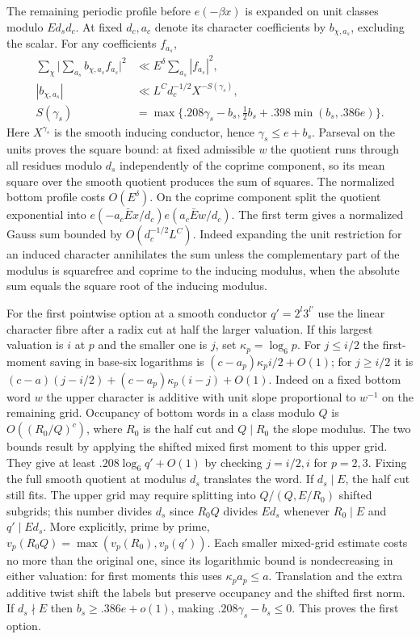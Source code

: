 \documentclass[11pt,a4paper]{article}
\theoremstyle{paperplain}
\numberwithin{equation}{section}
\begin{document}
The remaining periodic profile before $e(-\beta x)$ is expanded
on unit classes modulo $Ed_sd_c$. At fixed $d_c,a_c$ denote its
character coefficients by $b_{\chi,a_s}$, excluding the scalar.
For any coefficients $f_{a_s}$,
\begin{align}
 \sum_\chi\Big|\sum_{a_s}b_{\chi,a_s}f_{a_s}\Big|^2
    &\ll E^\delta\sum_{a_s}|f_{a_s}|^2, \label{six:sixmask-charsquare}\\
 |b_{\chi,a_s}|&\ll L^C d_c^{-1/2}
             X^{-S(\gamma_s)},\nonumber\\
 S(\gamma_s)&=\max\{
 .208\gamma_s-b_s,\tfrac12 b_s+.398\min(b_s,.386e)\}.
 \label{six:sixmask-charpoint}
\end{align}
Here $X^{\gamma_s}$ is the smooth inducing conductor, hence
$\gamma_s\le e+b_s$. Parseval on the units proves the square
bound: at fixed admissible $w$ the quotient runs through all
residues modulo $d_s$ independently of the coprime component, so
its mean square over the smooth quotient produces the sum of
squares. The normalized bottom profile costs $O(E^\delta)$.
On the coprime component split the quotient exponential into
$e(-a_c\bar E x/d_c)e(a_c\bar E w/d_c)$. The first term gives
a normalized Gauss sum bounded by $O(d_c^{-1/2}L^C)$.
Indeed expanding the unit restriction for an induced character
annihilates the sum unless the complementary part of the modulus
is squarefree and coprime to the inducing modulus, when the
absolute sum equals the square root of the inducing modulus.

For the first pointwise option at a smooth conductor $q'=2^l3^{l'}$
use the linear character fibre after a radix cut at half the larger
valuation. If this largest valuation is $i$ at $p$ and the smaller
one is $j$, set $\kappa_p=\log_6p$. For $j\le i/2$ the first-moment
saving in base-six logarithms is
$(c-a_p)\kappa_p i/2+O(1)$; for $j\ge i/2$ it is
$(c-a)(j-i/2)+(c-a_p)\kappa_p(i-j)+O(1)$.
Indeed on a fixed bottom word $w$ the upper character is additive
with unit slope proportional to $w^{-1}$ on the remaining grid.
Occupancy of bottom words in a class modulo $Q$ is
$O((R_0/Q)^c)$, where $R_0$ is the half cut and $Q\mid R_0$
the slope modulus. The two bounds result by applying the shifted
mixed first moment to this upper grid. They give at least
$.208\log_6 q'+O(1)$ by checking $j=i/2,i$ for $p=2,3$.
Fixing the full smooth quotient at modulus $d_s$ translates the
word. If $d_s\mid E$, the half cut still fits. The upper grid may
require splitting into $Q/(Q,E/R_0)$ shifted subgrids;
this number divides $d_s$ since $R_0Q$ divides $E d_s$ whenever
$R_0\mid E$ and $q'\mid Ed_s$. More explicitly, prime by prime,
$v_p(R_0Q)=\max(v_p(R_0),v_p(q'))$. Each smaller mixed-grid
estimate costs no more than the original one, since its logarithmic
bound is nondecreasing in either valuation: for first moments
this uses $\kappa_p a_p\le a$. Translation and the extra additive
twist shift the labels but preserve occupancy and the shifted first
norm. If $d_s\nmid E$ then $b_s\ge .386e+o(1)$, making
$.208\gamma_s-b_s\le0$. This proves the first option.
\end{document}
